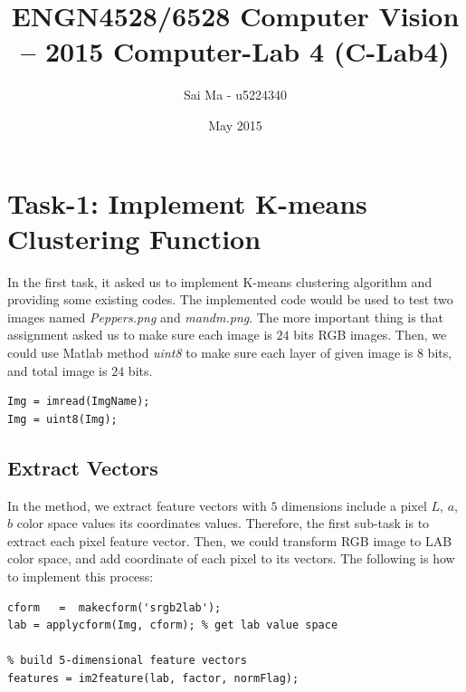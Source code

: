 \documentclass[12pt]{article}
\title{ENGN4528/6528 Computer Vision – 2015 Computer-Lab 4 (C-Lab4)}
\author{Sai Ma - u5224340}
\date{May 2015}
\begin{document}
\maketitle


\section{Task-1: Implement K-means Clustering Function}
In the first task, it asked us to implement K-means clustering algorithm and providing some existing codes. The implemented code would be used to test two images named \textit{Peppers.png} and \textit{mandm.png}. The more important thing is that assignment asked us to make sure each image is $24$ bits RGB images. Then, we could use Matlab method \textit{uint8} to make sure each layer of given image is $8$ bits, and total image is $24$ bits.

\begin{lstlisting}
Img = imread(ImgName);
Img = uint8(Img);
\end{lstlisting}

\subsection{Extract Vectors}

In the method, we extract feature vectors with $5$ dimensions include a pixel $L$, $a$, $b$ color space values its coordinates values. Therefore, the first sub-task is to extract each pixel feature vector. Then, we could transform RGB image to LAB color space, and add coordinate of each pixel to its vectors. The following is how to implement this process:

\begin{lstlisting}
cform   =  makecform('srgb2lab');
lab = applycform(Img, cform); % get lab value space

% build 5-dimensional feature vectors
features = im2feature(lab, factor, normFlag);
\end{lstlisting}
\end{document}
